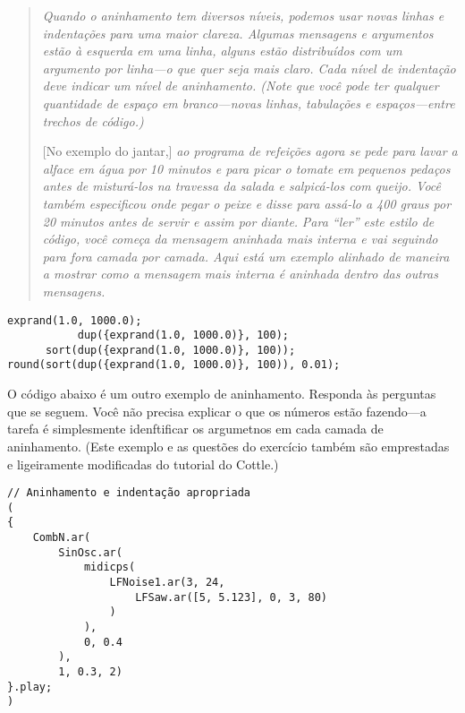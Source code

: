 \begin{quotation}
\textit{Quando o aninhamento tem diversos níveis, podemos usar novas linhas e indentações para uma maior clareza. Algumas mensagens e argumentos estão à esquerda em uma linha, alguns estão distribuídos com um argumento por linha---o que quer seja mais claro. Cada nível de indentação deve indicar um nível de aninhamento. (Note que você pode ter qualquer quantidade de espaço em branco---novas linhas, tabulações e espaços---entre trechos de código.)}

[No exemplo do jantar,]\textit{ ao programa de refeições agora se pede para lavar a alface em água por 10 minutos e para picar o tomate em pequenos pedaços antes de misturá-los na travessa da salada e salpicá-los com queijo. Você também especificou onde pegar o peixe e disse para assá-lo a 400 graus por 20 minutos antes de servir e assim por diante.} 
\textit{Para “ler” este estilo de código, você começa da mensagem aninhada mais interna e vai seguindo para fora camada por camada. Aqui está um exemplo alinhado de maneira a mostrar como a mensagem mais interna é aninhada dentro das outras mensagens.}
\end{quotation}

%

\begin{lstlisting}[style=SuperCollider-IDE, basicstyle=\scttfamily\footnotesize]
                exprand(1.0, 1000.0);
           dup({exprand(1.0, 1000.0)}, 100);
      sort(dup({exprand(1.0, 1000.0)}, 100));
round(sort(dup({exprand(1.0, 1000.0)}, 100)), 0.01);
\end{lstlisting}

O código abaixo é um outro exemplo de aninhamento. Responda às perguntas que se seguem. Você não precisa explicar o que os números estão fazendo---a tarefa é simplesmente idenftificar os argumetnos em cada camada de aninhamento. (Este exemplo e as questões do exercício também são emprestadas e ligeiramente modificadas do tutorial do Cottle.)

 
%

\begin{lstlisting}[style=SuperCollider-IDE, basicstyle=\scttfamily\footnotesize]
// Aninhamento e indentação apropriada
(
{
	CombN.ar(
		SinOsc.ar(
			midicps(
				LFNoise1.ar(3, 24,
					LFSaw.ar([5, 5.123], 0, 3, 80)
				)
			),
			0, 0.4
		),
		1, 0.3, 2)
}.play;
)
\end{lstlisting}

